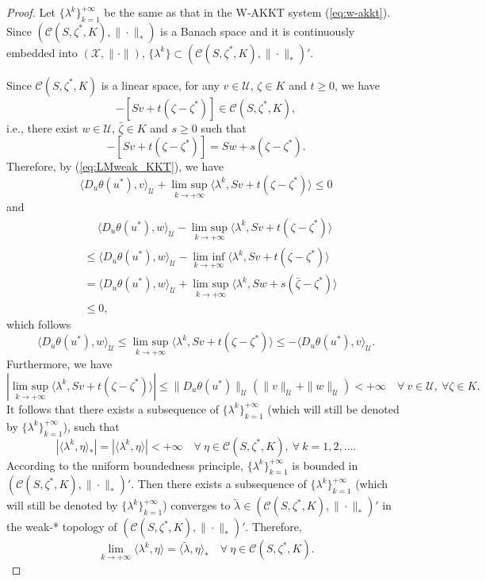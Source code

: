\documentclass[leqno]{amsart}
\DeclareMathOperator*\lowlim{lim\ inf}
\DeclareMathOperator*\uplim{lim\ sup}
\theoremstyle{definition}
\begin{document}
\begin{proof}
  Let $\{\lambda^k\}_{k=1}^{+\infty}$ be the same as that in the W-AKKT system (\ref{eq:w-akkt}). Since $(\mathcal{C}(S, \zeta^*, K), \|\cdot\|_*)$ is a Banach space and it is continuously embedded into $(\mathcal{X}, \|\cdot\|)$, $\{\lambda^k\}\subset (\mathcal{C}(S, \zeta^*, K), \|\cdot\|_*)'$.

Since $\mathcal{C}(S, \zeta^*, K)$ is a linear space, for any $v\in \mathcal{U}$, $\zeta \in K$ and $t\geq 0$, we have 
$$-[Sv + t(\zeta - \zeta^*)]\in  \mathcal{C}(S, \zeta^*, K),$$
i.e., there exist $w\in \mathcal{U}$, $\bar{\zeta}\in K$ and $s\geq 0$ such that
$$-[Sv + t(\zeta - \zeta^*)] = Sw + s(\zeta - \zeta^*).$$
Therefore, by (\ref{eq:LMweak_KKT}), we have
$$ \langle D_u\theta(u^*), v\rangle_\mathcal{U}  + \uplim\limits_{k\rightarrow +\infty}\langle \lambda^{k}, Sv + t(\zeta - \zeta^*)\rangle \leq 0 $$
and
\begin{equation}\nonumber
\begin{aligned}
&\quad\  \langle D_u\theta(u^*), w\rangle_\mathcal{U}  - \uplim\limits_{k\rightarrow +\infty}\langle \lambda^{k}, Sv + t(\zeta - \zeta^*)\rangle\\
&\leq \langle D_u\theta(u^*), w\rangle_\mathcal{U}  - \lowlim\limits_{k\rightarrow +\infty}\langle \lambda^{k}, Sv + t(\zeta - \zeta^*)\rangle\\
& = \langle D_u\theta(u^*), w\rangle_\mathcal{U}  + \uplim\limits_{k\rightarrow +\infty}\langle \lambda^{k}, Sw + s(\bar{\zeta} - \zeta^*)\rangle\\
& \leq 0,
\end{aligned}
\end{equation}
which follows
$$ \langle D_u\theta(u^*), w\rangle_\mathcal{U} \leq \uplim\limits_{k\rightarrow +\infty}\langle \lambda^{k}, Sv + t(\zeta - \zeta^*)\rangle \leq -\langle D_u\theta(u^*), v\rangle_\mathcal{U}.$$
Furthermore, we have 
$$ |\uplim\limits_{k\rightarrow +\infty}\langle \lambda^{k}, Sv + t(\zeta - \zeta^*)\rangle| \leq \|D_u\theta(u^*)\|_{\mathcal{U}}(\|v\|_{\mathcal{U}} + \|w\|_{\mathcal{U}}) < + \infty\quad \forall\ v\in \mathcal{U},\ \forall \zeta \in K.$$
It follows that there exists a subsequence of $\{\lambda^k\}_{k=1}^{+\infty}$ (which will still be denoted by  $\{\lambda^k\}_{k=1}^{+\infty}$), such that
$$|\langle \lambda^{k}, \eta \rangle_*| = |\langle \lambda^{k}, \eta \rangle|< +\infty\quad \forall\ \eta \in \mathcal{C}(S, \zeta^*, K),\ \forall\ k = 1, 2, \dots.$$
According to the uniform boundedness principle,  $\{\lambda^k\}_{k=1}^{+\infty}$ is bounded in\\
 $(\mathcal{C}(S, \zeta^*, K), \|\cdot\|_*)'$. Then there exists a subsequence of $\{\lambda^k\}_{k=1}^{+\infty}$ (which will still be denoted by  $\{\lambda^k\}_{k=1}^{+\infty}$) converges to $\tilde{\lambda} \in (\mathcal{C}(S, \zeta^*, K), \|\cdot\|_*)'$ in the weak-* topology of $(\mathcal{C}(S, \zeta^*, K), \|\cdot\|_*)'$. Therefore,
$$ \lim\limits_{k\rightarrow +\infty}\langle \lambda^k, \eta\rangle = \langle \tilde{\lambda}, \eta\rangle_*\quad \forall\ \eta \in \mathcal{C}(S, \zeta^*, K).$$


\end{proof}
\end{document}
